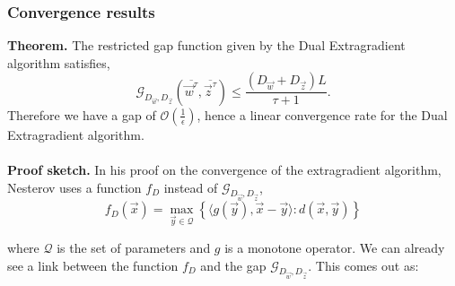 \documentclass{article}
\begin{document}
\subsubsection{Convergence results} 
\textbf{Theorem.} The restricted gap function given by the Dual Extragradient algorithm satisfies, 
\begin{equation} \mathcal{G}_{D_{\vec w}, D_{\vec z}}(\overline{\vec w^{\tau}},
\overline{\vec z^{\tau}}) \leq \frac{\left( D_{\vec w} + D_{\vec z} \right)
L}{\tau + 1}.
\label{eq:ub}
\end{equation}
Therefore we have a gap of $\mathcal{O}(\frac{1}{\epsilon})$, hence a linear convergence rate for the Dual Extragradient algorithm.\\
\\
\textbf{Proof sketch.} In his proof on the convergence of the extragradient algorithm, Nesterov uses a
function $f_D$ instead of $\mathcal{G}_{D_{\vec w}, D_{\vec z}}$, 
\begin{equation}
f_D(\vec x) = \max_{\vec y \in \mathcal{Q}} \left \{ \langle g(\vec y), \vec x -
\vec y \rangle : d(\vec x, \vec y) \right \}
\end{equation}

where $\mathcal{Q}$ is the set of parameters and $g$ is a monotone
operator. We can already see a link between the function $f_D$ and the gap
$\mathcal{G}_{D_{\vec w}, D_{\vec z}}$. This comes out as:
\end{document}
